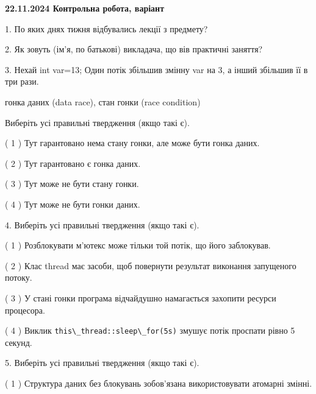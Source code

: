 \documentclass[12pt, ukrainian]{article}
\def\code#1{\Verb!#1!}
\begin{document}
\vspace{4mm}
\newpage
\begin {large}

\textbf{22.11.2024 Контрольна робота, варіант  }\par


{
1. По яких днях тижня відбувались лекції з предмету?



\vspace{5mm}
2. Як зовуть (ім'я, по батькові) викладача, що вів практичні заняття?



\vspace{5mm}
3. Нехай int var=13; Один потік збільшив змінну var на 3, а інший збільшив її в три рази.

гонка даних (data race), стан гонки (race condition)

Виберіть усі правильні твердження (якщо такі є).\par
\vspace{2mm}
( 1 ) Тут гарантовано нема стану гонки, але може бути гонка даних.%

( 2 ) Тут гарантовано є гонка даних.%

( 3 ) Тут може не бути стану гонки.%

( 4 ) Тут може не бути гонки даних.%


\vspace{5mm}
4. Виберіть усі правильні твердження (якщо такі є).\par
\vspace{2mm}

( 1 ) Розблокувати м’ютекс може тільки той потік, що його заблокував.%

( 2 ) Клас thread має засоби, щоб повернути результат виконання запущеного потоку.%

( 3 ) У стані гонки програма відчайдушно намагається захопити ресурси процесора.%

( 4 ) Виклик \code{this\_thread::sleep\_for(5s)} змушує потік проспати рівно 5 секунд.%


\vspace{5mm}
5. Виберіть усі правильні твердження (якщо такі є).\par
\vspace{2mm}

( 1 ) Структура даних без блокувань зобов’язана використовувати атомарні змінні.%

}
\end{large}
\end{document}
